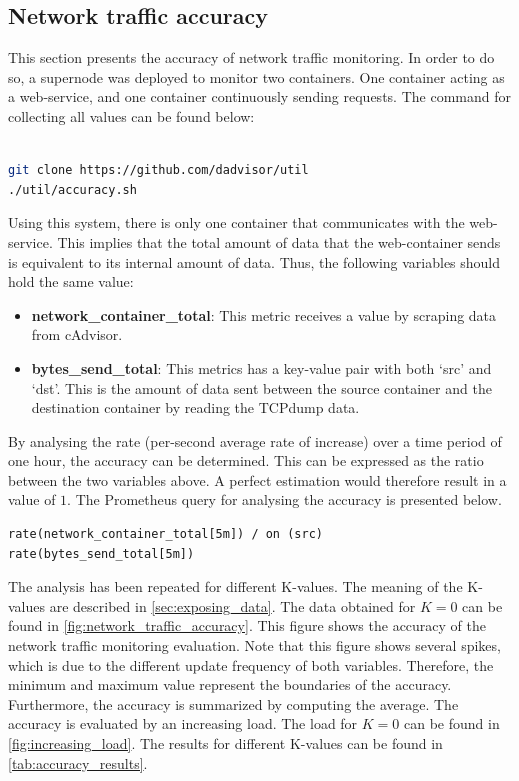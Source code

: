 \subsection{Network traffic accuracy} \label{sec:eval_k}
This section presents the accuracy of network traffic monitoring. In order to do so, a supernode was deployed to monitor two containers. One container acting as a web-service, and one container continuously sending requests. The command for collecting all values can be found below:\\\\


\begin{lstlisting}[language=bash, caption=Docker-compose]
git clone https://github.com/dadvisor/util
./util/accuracy.sh
\end{lstlisting}

\noindent
Using this system, there is only one container that communicates with the web-service. This implies that the total amount of data that the web-container sends is equivalent to its internal amount of data. Thus, the following variables should hold the same value:
\begin{itemize}
    \item \textbf{network\_container\_total}: This metric receives a value by scraping data from cAdvisor.
    \item \textbf{bytes\_send\_total}: This metrics has a key-value pair with both `src' and `dst'. This is the amount of data sent between the source container and the destination container by reading the TCPdump data.
\end{itemize}

\noindent
By analysing the rate (per-second average rate of increase) over a time period of one hour, the accuracy can be determined. This can be expressed as the ratio between the two variables above. A perfect estimation would therefore result in a value of $1$. The Prometheus query for analysing the accuracy is presented below.

\begin{verbatim}
rate(network_container_total[5m]) / on (src) 
rate(bytes_send_total[5m])
\end{verbatim}

\noindent
The analysis has been repeated for different K-values. The meaning of the K-values are described in \autoref{sec:exposing_data}. The data obtained for $K = 0$ can be found in \autoref{fig:network_traffic_accuracy}. This figure shows the accuracy of the network traffic monitoring evaluation. Note that this figure shows several spikes, which is due to the different update frequency of both variables. Therefore, the minimum and maximum value represent the boundaries of the accuracy. Furthermore, the accuracy is summarized by computing the average. The accuracy is evaluated by an increasing load. The load for $K = 0$ can be found in \autoref{fig:increasing_load}. The results for different K-values can be found in \autoref{tab:accuracy_results}.\\

